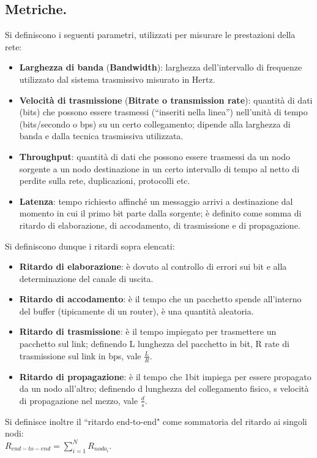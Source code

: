 \documentclass[11pt, italian, openany]{book}
\begin{document}
\begin{sloppypar}
\subsection{Metriche.}
Si definiscono i seguenti parametri, utilizzati per misurare le prestazioni della rete:
\begin{itemize}[topsep=0pt, itemsep=0pt, parsep=0pt]
	\item \textbf{Larghezza di banda} (\textbf{Bandwidth}): larghezza dell’intervallo di frequenze utilizzato dal sistema trasmissivo misurato in Hertz.
	\item \textbf{Velocit\`a di trasmissione} (\textbf{Bitrate o transmission rate}): quantit\`a di dati (bits) che possono essere trasmessi (“inseriti
	nella linea”) nell'unit\`a di tempo (bits/secondo o bps) su un certo collegamento; dipende alla larghezza di banda e dalla tecnica trasmissiva
	utilizzata.
	\item \textbf{Throughput}: quantit\`a di dati che possono essere trasmessi da un nodo sorgente a un nodo destinazione in un certo intervallo di tempo
	al netto di perdite sulla rete, duplicazioni, protocolli etc.
	\item \textbf{Latenza}: tempo richiesto affinch\'e un messaggio arrivi a destinazione dal momento in cui il primo bit parte dalla sorgente; \`e
	definito come somma di ritardo di elaborazione, di accodamento, di trasmissione e di propagazione.
\end{itemize}
Si definiscono dunque i ritardi sopra elencati:
\begin{itemize}[topsep=0pt, itemsep=0pt, parsep=0pt]
	\item \textbf{Ritardo di elaborazione}: \`e dovuto al controllo di errori sui bit e alla determinazione del canale di uscita.
	\item \textbf{Ritardo di accodamento}: \`e il tempo che un pacchetto spende all'interno del buffer (tipicamente di un router), \`e una
	quantit\`a aleatoria.
	\item \textbf{Ritardo di trasmissione}: \`e il tempo impiegato per trasmettere un pacchetto sul link; definendo L lunghezza del pacchetto in bit,
	R rate di trasmissione sul link in bps, vale \( \frac{L}{R} \).
	\item \textbf{Ritardo di propagazione}: \`e il tempo che 1bit impiega per essere propagato da un nodo all'altro; definendo d lunghezza del
	collegamento fisico, s velocit\`a di propagazione nel mezzo, vale \( \frac{d}{s} \).
\end{itemize}
Si definisce inoltre il ``ritardo end-to-end" come sommatoria del ritardo ai singoli nodi: \\\( R_{end-to-end} = \sum_{i=1}^{N} R_{nodo_i}\).


\end{sloppypar}
\end{document}
